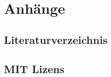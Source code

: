 \documentclass[ngerman,a4paper,headsepline,11pt,twoside,DIV=12,BCOR=15mm]{scrbook}
\begin{document}
	
	
	
	
	
	
	
	
	
	\part*{Anhänge}
	\appendix
	\chapter{Literaturverzeichnis}
	\printbibliography[heading=none]
	\chapter{MIT Lizens}
	
\end{document}
